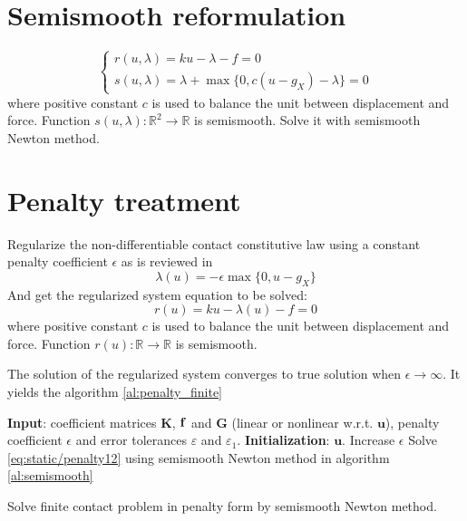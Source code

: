 \documentclass[fleqn,12pt,letter]{reportY}
\numberwithin{figure}{chapter}
\begin{document}
\section{Semismooth reformulation}
\begin{equation}
\begin{cases}
r(u,\lambda ) = ku-\lambda -f = 0
\\	s(u,\lambda) = \lambda + \max \{ 0, c(u-g_X) - \lambda \} =0 
\end{cases}
\end{equation}
where positive constant $c$ is used to balance the unit between displacement and force. Function $s(u,\lambda): \mathbb R^2 \rightarrow \mathbb R $ is semismooth. Solve it with semismooth Newton method.
\section{Penalty treatment}
Regularize the non-differentiable contact constitutive law using a constant penalty coefficient $\epsilon$ as is reviewed in \cite{wriggers2006computational} 
\begin{equation}\label{eq:static/penalty11}
\lambda(u) = -\epsilon \max\{ 0, u-g_X\}
\end{equation}
And get the regularized system equation to be solved: 
\begin{equation}\label{eq:static/penalty12}
r(u) = ku-\lambda(u) -f = 0
\end{equation}
where positive constant $c$ is used to balance the unit between displacement and force. Function $r(u): \mathbb R \rightarrow \mathbb R $ is semismooth. 

The solution of the regularized system converges to true solution when $\epsilon \rightarrow \infty$. It yields the algorithm \ref{al:penalty_finite} 
\begin{algo}
\begin{algobox}
\begin{algorithmic}[1]%
\STATE \textbf{Input}: coefficient matrices $\mathbf K$, $\mathbf{f}$ and $\mathbf G$ (linear or nonlinear w.r.t. $\mathbf u$), penalty coefficient $\epsilon$ and error tolerances $\varepsilon$ and $\varepsilon_1$.
\STATE \textbf{Initialization}: $\mathbf u$. 
	\STATE Increase $\epsilon$
		\STATE Solve \eqref{eq:static/penalty12} using semismooth Newton method in algorithm \ref{al:semismooth}
	\ENDWHILE
\ENDWHILE
\end{algorithmic}
\end{algobox}
\caption{Solve finite contact problem in penalty form by semismooth Newton method.}\label{al:penalty_finite}
\end{algo}
\end{document}
